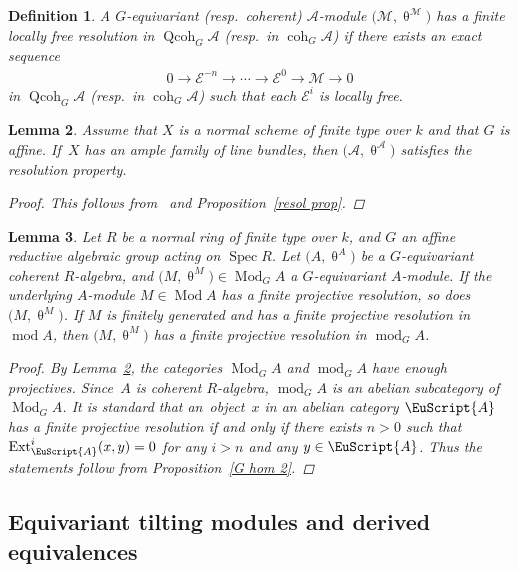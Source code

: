 \documentclass[10pt,a4paper]{amsart}
\newtheorem{dfn}{Definition}[section]
\newtheorem{lem}[dfn]{Lemma}
\numberwithin{equation}{section}
\newcommand{\Spec}{\operatorname{Spec}}
\newcommand{\Ext}{\operatorname{Ext}}
\newcommand{\coh}{\operatorname{coh}}
\newcommand{\Qcoh}{\operatorname{Qcoh}}
\newcommand{\Mod}{\operatorname{Mod}}
\newcommand{\fmod}{\operatorname{mod}}
\newcommand{\cA}{\mathcal{A}}
\newcommand{\cE}{\mathcal{E}}
\newcommand{\cM}{\mathcal{M}}
\newcommand{\scrA}{\EuScript{A}}
\begin{document}
\begin{dfn}
A $G$-equivariant (resp.\ coherent) $\cA$-module $\big(\cM,\uptheta^{\cM}\big)$ has a {\it finite locally free resolution} in $\Qcoh_G\cA$ (resp.\ in $\coh_G\cA$) if there exists an exact sequence
\begin{gather*}
0\to \cE^{-n}\to\cdots\to\cE^0\to \cM\to0
\end{gather*}
in $\Qcoh_G\cA$ (resp.\ in $\coh_G\cA$) such that each $\cE^i$ is locally free.
\end{dfn}


\begin{lem}\label{enough proj}
Assume that $X$ is a normal scheme of finite type over $k$ and that $G$ is affine.
If~$X$ has an ample family of line bundles, then $\big(\cA,\uptheta^{\cA}\big)$ satisfies the resolution property.
\begin{proof}
This follows from~\cite[Theorem~2.29]{bfk} and Proposition~\ref{resol prop}.
\end{proof}
\end{lem}

\begin{lem}\label{finite proj resol}
Let $R$ be a normal ring of finite type over $k$, and $G$ an affine reductive algebraic group acting on $\Spec R$. Let $\big(A,\uptheta^{A}\big)$ be a $G$-equivariant coherent $R$-algebra, and $\big(M,\uptheta^M\big)\in \Mod_GA$ a $G$-equivariant $A$-module. If the underlying $A$-module $M\in \Mod A$ has a finite projective resolution, so does $\big(M,\uptheta^M\big)$. If $M$ is finitely generated and has a finite projective resolution in $\fmod A$, then $\big(M,\uptheta^M\big)$ has a finite projective resolution in $\fmod_GA$.
\begin{proof}
By Lemma~\ref{enough proj}, the categories $\Mod_GA$ and $\fmod_GA$ have enough projectives. Since~$A$ is coherent $R$-algebra, $\fmod_GA$ is an abelian subcategory of $\Mod_GA$. It is standard that an~object~$x$ in an abelian category $\scrA$ has a finite projective resolution if and only if there exists $n>0$ such that $\Ext_{\scrA}^i(x,y)=0$ for any $i>n$ and any $y\in \scrA$. Thus the statements follow from Proposition~\ref{G hom 2}.
\end{proof}
\end{lem}

\subsection{Equivariant tilting modules and derived equivalences}\label{derived section}
\end{document}
